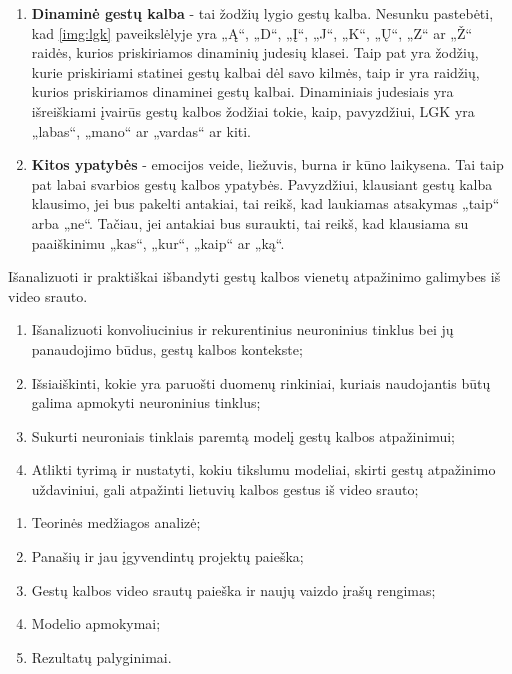 \documentclass{VUMIFPSbakalaurinis}
\begin{document}
\begin{enumerate}
	\item\textbf{Dinaminė gestų kalba} - tai žodžių lygio gestų kalba. Nesunku pastebėti, kad \ref{img:lgk} paveikslėlyje yra „Ą“, „D“, „Į“, „J“, „K“, „Ų“, „Z“ ar „Ž“ raidės, kurios priskiriamos dinaminių judesių klasei. Taip pat yra žodžių, kurie priskiriami statinei gestų kalbai dėl savo kilmės, taip ir yra raidžių, kurios priskiriamos dinaminei gestų kalbai. Dinaminiais judesiais yra išreiškiami įvairūs gestų kalbos žodžiai tokie, kaip, pavyzdžiui, LGK yra „labas“, „mano“ ar „vardas“ ar kiti.
	
	\item\textbf{Kitos ypatybės} - emocijos veide, liežuvis, burna ir kūno laikysena. Tai taip pat labai svarbios gestų kalbos ypatybės. Pavyzdžiui, klausiant gestų kalba klausimo, jei bus pakelti antakiai, tai reikš, kad laukiamas atsakymas „taip“ arba „ne“. Tačiau, jei antakiai bus suraukti, tai reikš, kad klausiama su paaiškinimu „kas“, „kur“, „kaip“ ar „ką“.
\end{enumerate}


Išanalizuoti ir praktiškai išbandyti gestų kalbos vienetų atpažinimo galimybes iš video srauto.

\begin{enumerate}
	\item Išanalizuoti konvoliucinius ir rekurentinius neuroninius tinklus bei jų panaudojimo būdus, gestų kalbos kontekste;
	\item Išsiaiškinti, kokie yra paruošti duomenų rinkiniai, kuriais naudojantis būtų galima apmokyti neuroninius tinklus;
	\item Sukurti neuroniais tinklais paremtą modelį gestų kalbos atpažinimui;
	\item Atlikti tyrimą ir nustatyti, kokiu tikslumu modeliai, skirti gestų atpažinimo uždaviniui, gali atpažinti lietuvių kalbos gestus iš video srauto;
\end{enumerate}

\begin{enumerate}
	\item Teorinės medžiagos analizė;
	\item Panašių ir jau įgyvendintų projektų paieška;
	\item Gestų kalbos video srautų paieška ir naujų vaizdo įrašų rengimas;
	\item Modelio apmokymai;
	\item Rezultatų palyginimai.
\end{enumerate}
\end{document}
